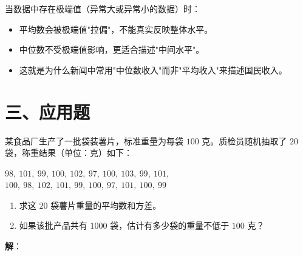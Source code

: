 \documentclass[12pt, a4paper]{ctexart}
\begin{document}
\begin{tipbox}[方法总结]
当数据中存在极端值（异常大或异常小的数据）时：
\begin{itemize}[leftmargin=2em]
  \item 平均数会被极端值"拉偏"，不能真实反映整体水平。
  \item 中位数不受极端值影响，更适合描述"中间水平"。
  \item 这就是为什么新闻中常用"中位数收入"而非"平均收入"来描述国民收入。
\end{itemize}
\end{tipbox}

\section*{\textcolor{apppurple}{三、应用题}}

\begin{appbox}
某食品厂生产了一批袋装薯片，标准重量为每袋 $100$ 克。质检员随机抽取了 $20$ 袋，称重结果（单位：克）如下：

$98,\ 101,\ 99,\ 100,\ 102,\ 97,\ 100,\ 103,\ 99,\ 101,$
$100,\ 98,\ 102,\ 101,\ 99,\ 100,\ 97,\ 101,\ 100,\ 99$

\begin{enumerate}[leftmargin=2em]
  \item 求这 $20$ 袋薯片重量的平均数和方差。
  \item 如果该批产品共有 $1000$ 袋，估计有多少袋的重量不低于 $100$ 克？
\end{enumerate}
\end{appbox}

\textbf{解}：
\end{document}
